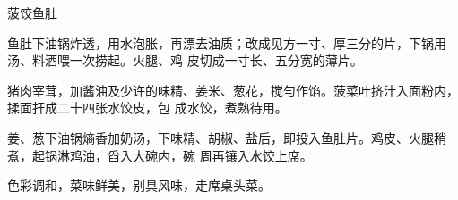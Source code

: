 \begin{recipe}{菠饺鱼肚}

\ingredients


\cooking

\step 鱼肚下油锅炸透，用水泡胀，再漂去油质；改成见方一寸、厚三分的片，下锅用汤、料酒喂一次捞起。火腿、鸡
皮切成一寸长、五分宽的薄片。

猪肉宰茸，加酱油及少许的味精、姜米、葱花，搅勻作馅。菠菜叶挤汁入面粉内，揉面扞成二十四张水饺皮，包
成水饺，煮熟待用。

姜、葱下油锅熵香加奶汤，下味精、胡椒、盐后，即投入鱼肚片。鸡皮、火腿稍煮，起锅淋鸡油，舀入大碗内，碗
周再镶入水饺上席。

\notes

色彩调和，菜味鲜美，别具风味，走席桌头菜。

\end{recipe}

